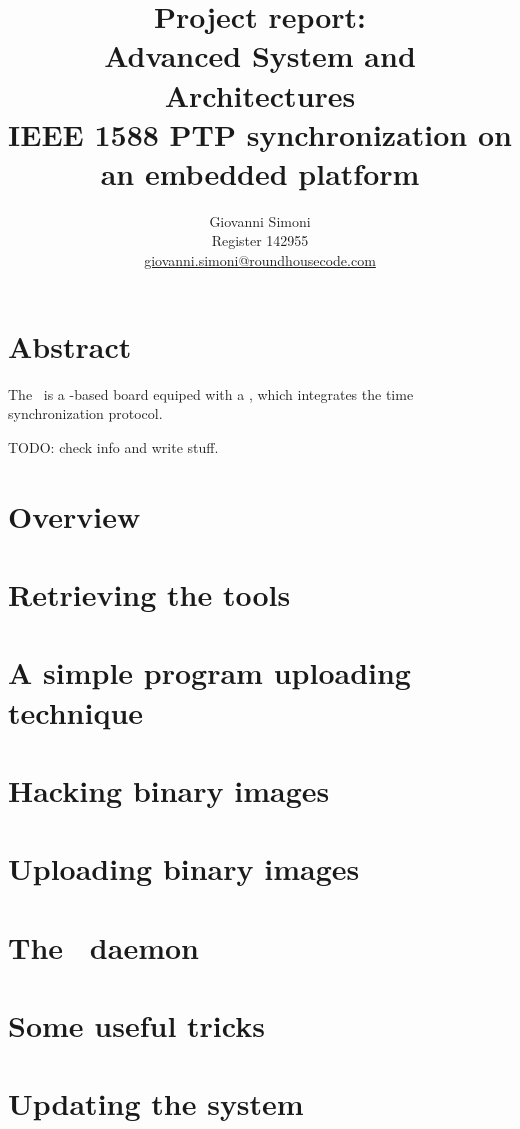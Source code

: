 \documentclass[10pt,a4paper]{article}
\title {
    Project report:\\
    Advanced System and Architectures\\
    IEEE 1588 PTP synchronization on an embedded platform
}
\author{
    Giovanni Simoni\\
    Register 142955\\
    \href{mailto:giovanni.simoni@roundhousecode.com}
         {giovanni.simoni@roundhousecode.com}
}
\begin{document}
\maketitle

    \section*{ \center Abstract }

        The \MyBoard\ is a \PPC-based board equiped with a
        , which integrates the
         time synchronization protocol.

        TODO: check info and write stuff.

    \tableofcontents
    \newpage

    \section{ Overview } \label{sec:Overview}
    

    \section{ Retrieving the tools } \label{sec:GetTools}
    

    \section{ A simple program uploading technique } \label{sec:Upload}
    

    \section{ Hacking binary images } \label{sec:HackImages}
    

    \section{ Uploading binary images } \label{sec:UploadImages}
    

    \section{ The \PTP\ daemon } \label{sec:PTPd}

    \section{ Some useful tricks } \label{sec:Tricks}
    

    \section{ Updating the system } \label{sec:Update}
\end{document}
